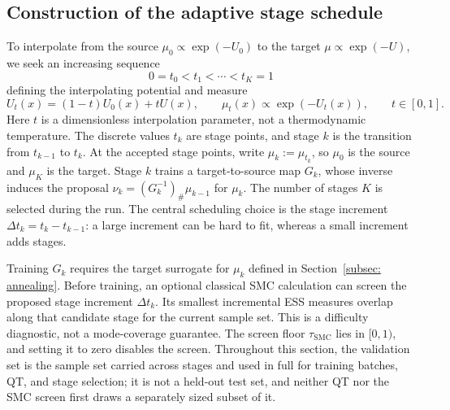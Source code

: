 \documentclass{article}
\begin{document}
\subsection{Construction of the adaptive stage schedule}

To interpolate from the source $\mu_0 \propto \exp(-U_0)$ to the target $\mu \propto \exp(-U)$, we seek an increasing sequence
\begin{equation*}
    0 = t_0 < t_1 < \cdots < t_K = 1
\end{equation*}
defining the interpolating potential and measure
\begin{equation*}
    U_t(x)=(1-t)U_0(x)+tU(x),
\qquad \mu_t(x)\propto\exp(-U_t(x)),
    \qquad t\in[0,1].
\end{equation*}
Here $t$ is a dimensionless interpolation parameter, not a thermodynamic temperature. The discrete values $t_k$ are stage points, and stage $k$ is the transition from $t_{k-1}$ to $t_k$. At the accepted stage points, write $\mu_k:=\mu_{t_k}$, so $\mu_0$ is the source and $\mu_K$ is the target. Stage $k$ trains a target-to-source map $G_k$, whose inverse induces the proposal $\nu_k=(G_k^{-1})_{\#}\mu_{k-1}$ for $\mu_k$. The number of stages $K$ is selected during the run. The central scheduling choice is the stage increment $\Delta t_k=t_k-t_{k-1}$: a large increment can be hard to fit, whereas a small increment adds stages.

Training $G_k$ requires the target surrogate for $\mu_k$ defined in Section~\ref{subsec: annealing}. Before training, an optional classical SMC calculation can screen the proposed stage increment $\Delta t_k$. Its smallest incremental ESS measures overlap along that candidate stage for the current sample set. This is a difficulty diagnostic, not a mode-coverage guarantee. The screen floor $\tau_{\mathrm{SMC}}$ lies in $[0,1)$, and setting it to zero disables the screen. Throughout this section, the validation set is the sample set carried across stages and used in full for training batches, QT, and stage selection; it is not a held-out test set, and neither QT nor the SMC screen first draws a separately sized subset of it.
\end{document}
